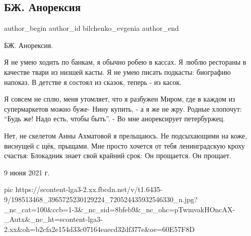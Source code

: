  
 
 
 
 
 
\subsection{БЖ. Анорексия}
\label{sec:09_06_2021.fb.bilchenko_evgenia.2.anoreksia}
\ifcmt
 author_begin
   author_id bilchenko_evgenia
 author_end
\fi

БЖ. Анорексия.

Я не умею ходить по банкам, я обычно робею в кассах.
Я люблю рестораны в качестве твари из низшей касты.
Я не умею писать подкасты: биографию напоказ.
В детстве я состоял из сказок, теперь - из касок.

Я совсем не сплю, меня утомляет, что я разбужен
Миром, где в каждом из супермаркетов можно буже-
Нину купить, - а я же не жру. Родные хлопочут: \enquote{Будь же!
Надо есть, чтобы быть}. - Во мне анорексирует петербуржец.

Нет, не скелетом Анны Ахматовой я прельщаюсь.
Не подсыхающими на коже, виснущей с щёк, прыщами.
Мне просто хочется от тебя ленинградскую кроху счастья:
Блокадник знает свой крайний срок:
Он прощается. 
Он прощает.

9 июня 2021 г.

\ifcmt
  pic https://scontent-lga3-2.xx.fbcdn.net/v/t1.6435-9/198513468_3965725230129224_720524435932546330_n.jpg?_nc_cat=100&ccb=1-3&_nc_sid=8bfeb9&_nc_ohc=pTwmvakHOncAX-_Autx&_nc_ht=scontent-lga3-2.xx&oh=b2cfa2e154d33c07164eaecd32df377e&oe=60E57F8D
\fi

